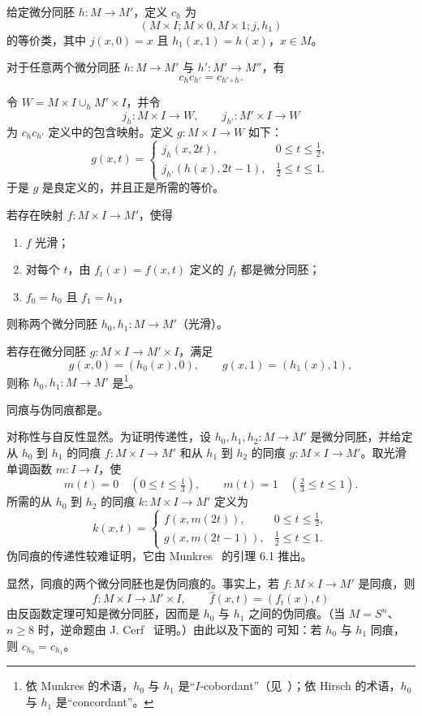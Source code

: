 给定微分同胚 $h:M\to M'$，定义 $c_h$ 为
\[
  (M\times I;M\times0,M\times1;j,h_1)
\]
的等价类，其中 $j(x,0)=x$ 且 $h_1(x,1)=h(x)$，$x\in M$。

对于任意两个微分同胚 $h:M\to M'$ 与 $h':M'\to M''$，有
\[
  c_hc_{h'}=c_{h'\circ h}.
\]

\Proof 令 $W=M\times I\cup_hM'\times I$，并令
\[
  j_h:M\times I\longrightarrow W,\qquad
  j_{h'}:M'\times I\longrightarrow W
\]
为 $c_hc_{h'}$ 定义中的包含映射。定义 $g:M\times I\to W$ 如下：
\[
g(x,t)=
\begin{cases}
  j_h(x,2t),&0\leq t\leq\tfrac12,\\
  j_{h'}(h(x),2t-1),&\tfrac12\leq t\leq1.
\end{cases}
\]
于是 $g$ 是良定义的，并且正是所需的等价。
\EndProof

若存在映射 $f:M\times I\to M'$，使得
\begin{enumerate}[label=(\arabic*)]
  \item $f$ 光滑；
  \item 对每个 $t$，由 $f_t(x)=f(x,t)$ 定义的 $f_t$ 都是微分同胚；
  \item $f_0=h_0$ 且 $f_1=h_1$，
\end{enumerate}
则称两个微分同胚 $h_0,h_1:M\to M'$（光滑）\emph{}。

若存在微分同胚 $g:M\times I\to M'\times I$，满足
\[
  g(x,0)=(h_0(x),0),\qquad g(x,1)=(h_1(x),1),
\]
则称 $h_0,h_1:M\to M'$ 是\emph{}\footnote{依 Munkres 的术语，$h_0$ 与 $h_1$ 是“$I$-cobordant”（见~\cite[p.~62]{ref05}）；依 Hirsch 的术语，$h_0$ 与 $h_1$ 是“concordant”。}。

同痕与伪同痕都是。

\Proof 对称性与自反性显然。为证明传递性，设 $h_0,h_1,h_2:M\to M'$ 是微分同胚，并给定从 $h_0$ 到 $h_1$ 的同痕 $f:M\times I\to M'$ 和从 $h_1$ 到 $h_2$ 的同痕 $g:M\times I\to M'$。取光滑单调函数 $m:I\to I$，使
\[
 m(t)=0\quad(0\leq t\leq\tfrac13),\qquad
 m(t)=1\quad(\tfrac23\leq t\leq1).
\]
所需的从 $h_0$ 到 $h_2$ 的同痕 $k:M\times I\to M'$ 定义为
\[
k(x,t)=
\begin{cases}
 f(x,m(2t)),&0\leq t\leq\tfrac12,\\
 g(x,m(2t-1)),&\tfrac12\leq t\leq1.
\end{cases}
\]
伪同痕的传递性较难证明，它由 Munkres~\cite[p.~59]{ref05} 的引理 6.1 推出。
\EndProof

显然，同痕的两个微分同胚也是伪同痕的。事实上，若 $f:M\times I\to M'$ 是同痕，则
\[
  \widehat f:M\times I\longrightarrow M'\times I,
  \qquad \widehat f(x,t)=(f_t(x),t)
\]
由反函数定理可知是微分同胚，因而是 $h_0$ 与 $h_1$ 之间的伪同痕。（当 $M=S^n$、$n\geq8$ 时，逆命题由 J. Cerf~\cite{ref39} 证明。）由此以及下面的 可知：若 $h_0$ 与 $h_1$ 同痕，则 $c_{h_0}=c_{h_1}$。

